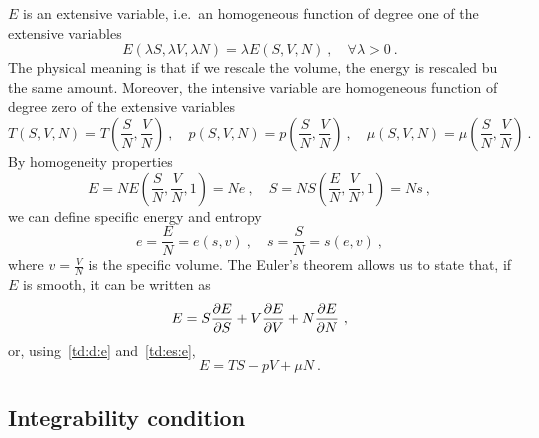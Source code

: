     $E$ is an extensive variable, i.e.~an homogeneous function of degree one of the extensive variables 
    \begin{equation*}
        E(\lambda S, \lambda V, \lambda N) = \lambda E(S, V, N) ~, \quad \forall \lambda > 0 ~.
    \end{equation*}
    The physical meaning is that if we rescale the volume, the energy is rescaled bu the same amount.
    Moreover, the intensive variable are homogeneous function of degree zero of the extensive variables 
    \begin{equation}\label{a5}
        T(S, V, N) = T(\frac{S}{N}, \frac{V}{N}) ~, \quad p(S, V, N) = p(\frac{S}{N}, \frac{V}{N}) ~, \quad \mu(S, V, N) = \mu(\frac{S}{N}, \frac{V}{N}) ~.
    \end{equation}
    By homogeneity properties 
    \begin{equation*}
        E = N E (\frac{S}{N}, \frac{V}{N}, 1) = N e ~, \quad  S = N S(\frac{E}{N}, \frac{V}{N}, 1) = N s ~,
    \end{equation*}
    we can define specific energy and entropy 
    \begin{equation*}
        e = \frac{E}{N} = e(s, v) ~, \quad s = \frac{S}{N} = s(e, v) ~,
    \end{equation*}
    where $v = \frac{V}{N}$ is the specific volume.
    The Euler's theorem allows us to state that, if $E$ is smooth, it can be written as 
    \begin{equation*}
        E = S \frac{\partial E}{\partial S} + V \frac{\partial E}{\partial V} + N \frac{\partial E}{\partial N} ~,
    \end{equation*}
    or, using~\eqref{td:d:e} and~\eqref{td:es:e}, 
    \begin{equation}\label{td:e}
        E = TS - pV + \mu N ~.
    \end{equation}

\subsection{Integrability condition} 

